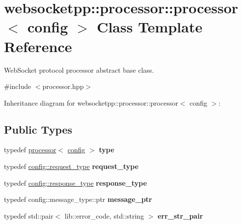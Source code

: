\hypertarget{classwebsocketpp_1_1processor_1_1processor}{}\section{websocketpp\+:\+:processor\+:\+:processor$<$ config $>$ Class Template Reference}
\label{classwebsocketpp_1_1processor_1_1processor}


Web\+Socket protocol processor abstract base class.  




{\ttfamily \#include $<$processor.\+hpp$>$}



Inheritance diagram for websocketpp\+:\+:processor\+:\+:processor$<$ config $>$\+:
\subsection*{Public Types}
\begin{DoxyCompactItemize}
\item 
\mbox{\label{classwebsocketpp_1_1processor_1_1processor_ae897e7144ad7b9ece176d13ea5078ae2}} 
typedef \mbox{\hyperlink{classwebsocketpp_1_1processor_1_1processor}{processor}}$<$ \mbox{\hyperlink{classconfig}{config}} $>$ {\bfseries type}
\item 
\mbox{\label{classwebsocketpp_1_1processor_1_1processor_ac3926102ce2422e6b40ccea41e764233}} 
typedef \mbox{\hyperlink{classwebsocketpp_1_1http_1_1parser_1_1request}{config\+::request\+\_\+type}} {\bfseries request\+\_\+type}
\item 
\mbox{\label{classwebsocketpp_1_1processor_1_1processor_aa8d088af1bdb838f1e86df6cf4395981}} 
typedef \mbox{\hyperlink{classwebsocketpp_1_1http_1_1parser_1_1response}{config\+::response\+\_\+type}} {\bfseries response\+\_\+type}
\item 
\mbox{\label{classwebsocketpp_1_1processor_1_1processor_a7f189eb2eb87b7293d46026fa0950635}} 
typedef config\+::message\+\_\+type\+::ptr {\bfseries message\+\_\+ptr}
\item 
\mbox{\label{classwebsocketpp_1_1processor_1_1processor_aa17cb49b100ed209ca8650895812be11}} 
typedef std\+::pair$<$ lib\+::error\+\_\+code, std\+::string $>$ {\bfseries err\+\_\+str\+\_\+pair}
\end{DoxyCompactItemize}
